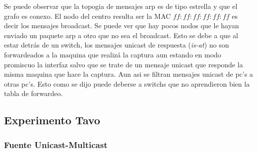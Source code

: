 Se puede observar que la topogia de mensajes arp es de tipo estrella
y que el grafo es conexo. El nodo del centro resulta ser la MAC $ff:ff:ff:ff:ff:ff$
es decir los mensajes broadcast. Se puede ver que hay pocos nodos que le hayan
enviado un paquete arp a otro que no sea el broadcast. Esto se debe
a que al estar detrás de un switch, los mensajes unicast de respuesta (\textit{is-at})
no son forwardeados a la maquina que realizá la captura aun estando en modo promiscuo
la interfaz salvo que se trate de un mensaje unicast que responde la misma maquina que
hace la captura. Aun asi se filtran mensajes unicast de pc's a otras pc's. Esto como
se dijo puede deberse a switchs que no aprendieron bien la tabla de forwardeo.

\subsection{Experimento Tavo}

\subsubsection{Fuente Unicast-Multicast}

